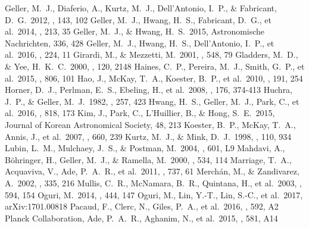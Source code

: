\documentclass[iop, apj]{emulateapj}
\begin{document}
\begin{thebibliography}{}
 Geller, M.~J., Diaferio, A., Kurtz, M.~J., Dell'Antonio, I.~P., \& Fabricant, D.~G.\ 2012, \aj, 143, 102   
 Geller, M.~J., Hwang, H.~S., Fabricant, D.~G., et al.\ 2014, \apjs, 213, 35  
 Geller, M.~J., \& Hwang, H.~S.\ 2015, Astronomische Nachrichten, 336, 428 
 Geller, M.~J., Hwang, H.~S., Dell'Antonio, I.~P., et al.\ 2016, \apjs, 224, 11  
 Girardi, M., \& Mezzetti, M.\ 2001, \apj, 548, 79 
 Gladders, M.~D., \& Yee, H.~K.~C.\ 2000, \aj, 120, 2148  
 Haines, C.~P., Pereira, M.~J., Smith, G.~P., et al.\ 2015, \apj, 806, 101  
 Hao, J., McKay, T.~A., Koester, B.~P., et al.\ 2010, \apjs, 191, 254 
 Horner, D.~J., Perlman, E.~S., Ebeling, H., et al.\ 2008, \apjs, 176, 374-413  
 Huchra, J.~P., \& Geller, M.~J.\ 1982, \apj, 257, 423 
 Hwang, H.~S., Geller, M.~J., Park, C., et al.\ 2016, \apj, 818, 173 
 Kim, J., Park, C., L'Huillier, B., \& Hong, S.~E.\ 2015, Journal of Korean Astronomical Society, 48, 213  
 Koester, B.~P., McKay, T.~A., Annis, J., et al.\ 2007, \apj, 660, 239 
 Kurtz, M.~J., \& Mink, D.~J.\ 1998, \pasp, 110, 934
 Lubin, L.~M., Mulchaey, J.~S., \& Postman, M.\ 2004, \apjl, 601, L9   
 Mahdavi, A., B{\"o}hringer, H., Geller, M.~J., \& Ramella, M.\ 2000, \apj, 534, 114  
 Marriage, T.~A., Acquaviva, V., Ade, P.~A.~R., et al.\ 2011, \apj, 737, 61   
 Merch{\'a}n, M., \& Zandivarez, A.\ 2002, \mnras, 335, 216  
 Mullis, C.~R., McNamara, B.~R., Quintana, H., et al.\ 2003, \apj, 594, 154 
 Oguri, M.\ 2014, \mnras, 444, 147 
 Oguri, M., Lin, Y.-T., Lin, S.-C., et al.\ 2017, arXiv:1701.00818
 Pacaud, F., Clerc, N., Giles, P.~A., et al.\ 2016, \aap, 592, A2  
 Planck Collaboration, Ade, P.~A.~R., Aghanim, N., et al.\ 2015, \aap, 581, A14 

\end{thebibliography}
\end{document}
